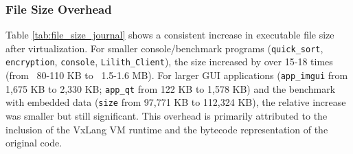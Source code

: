 \subsubsection{File Size Overhead}
Table \ref{tab:file_size_journal} shows a consistent increase in executable file size after virtualization. For smaller console/benchmark programs (\texttt{quick\_sort}, \texttt{encryption}, \texttt{console}, \texttt{Lilith\_Client}), the size increased by over 15-18 times (from ~80-110 KB to ~1.5-1.6 MB). For larger GUI applications (\texttt{app\_imgui} from 1,675 KB to 2,330 KB; \texttt{app\_qt} from 122 KB to 1,578 KB) and the benchmark with embedded data (\texttt{size} from 97,771 KB to 112,324 KB), the relative increase was smaller but still significant. This overhead is primarily attributed to the inclusion of the VxLang VM runtime and the bytecode representation of the original code.
\begin{table}[H]
    \centering
    \caption{Executable File Size Comparison (KB)}
    \label{tab:file_size_journal}
\end{table}

